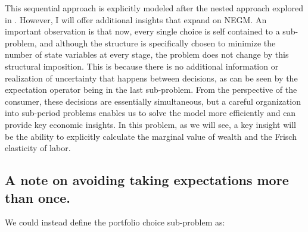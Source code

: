 \documentclass[\econtexRoot/SequentialEGM]{subfiles}
\begin{document}
This sequential approach is explicitly modeled after the nested approach explored in \cite{Druedahl2021-wl}. However, I will offer additional insights that expand on NEGM. An important observation is that now, every single choice is self contained to a sub-problem, and although the structure is specifically chosen to minimize the number of state variables at every stage, the problem does not change by this structural imposition. This is because there is no additional information or realization of uncertainty that happens between decisions, as can be seen by the expectation operator being in the last sub-problem. From the perspective of the consumer, these decisions are essentially simultaneous, but a careful organization into sub-period problems enables us to solve the model more efficiently and can provide key economic insights. In this problem, as we will see, a key insight will be the ability to explicitly calculate the marginal value of wealth and the Frisch elasticity of labor.

%

\subsection{A note on avoiding taking expectations more than once.}

We could instead define the portfolio choice sub-problem as:
\end{document}
